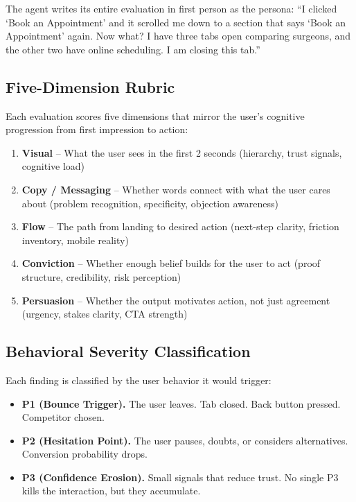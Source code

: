\documentclass[conference]{IEEEtran}
\providecommand{\tightlist}{%
  \setlength{\itemsep}{0pt}\setlength{\parskip}{0pt}}
\begin{document}
The agent writes its entire evaluation in first person as the persona: ``I clicked `Book an Appointment' and it scrolled me down to a section that says `Book an Appointment' again. Now what? I have three tabs open comparing surgeons, and the other two have online scheduling. I am closing this tab.''

\subsection{Five-Dimension Rubric}\label{five-dimension-rubric}

Each evaluation scores five dimensions that mirror the user's cognitive progression from first impression to action:

\begin{enumerate}
\def\labelenumi{\arabic{enumi}.}
\tightlist
\item
  \textbf{Visual} -- What the user sees in the first 2 seconds (hierarchy, trust signals, cognitive load)
\item
  \textbf{Copy / Messaging} -- Whether words connect with what the user cares about (problem recognition, specificity, objection awareness)
\item
  \textbf{Flow} -- The path from landing to desired action (next-step clarity, friction inventory, mobile reality)
\item
  \textbf{Conviction} -- Whether enough belief builds for the user to act (proof structure, credibility, risk perception)
\item
  \textbf{Persuasion} -- Whether the output motivates action, not just agreement (urgency, stakes clarity, CTA strength)
\end{enumerate}

\subsection{Behavioral Severity Classification}\label{behavioral-severity-classification}

Each finding is classified by the user behavior it would trigger:

\begin{itemize}
\tightlist
\item
  \textbf{P1 (Bounce Trigger).} The user leaves. Tab closed. Back button pressed. Competitor chosen.
\item
  \textbf{P2 (Hesitation Point).} The user pauses, doubts, or considers alternatives. Conversion probability drops.
\item
  \textbf{P3 (Confidence Erosion).} Small signals that reduce trust. No single P3 kills the interaction, but they accumulate.
\end{itemize}
\end{document}
